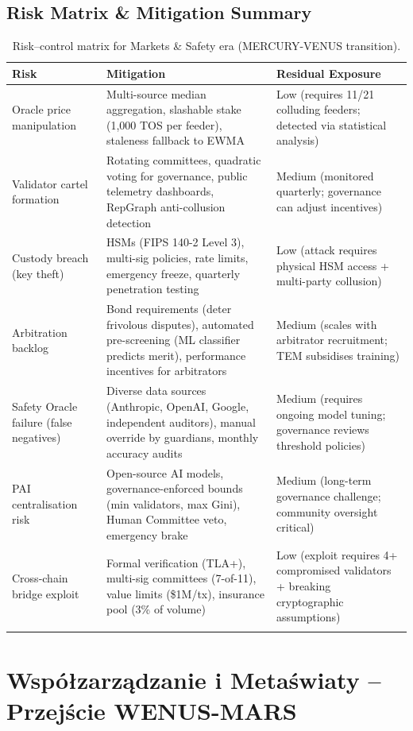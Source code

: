 \documentclass[11pt]{article}
\begin{document}
\subsection{Risk Matrix \& Mitigation Summary}
\begin{longtable}{@{}p{}p{}p{}@{}}
\toprule
\textbf{Risk} & \textbf{Mitigation} & \textbf{Residual Exposure} \\\midrule
Oracle price manipulation & Multi-source median aggregation, slashable stake (1,000 TOS per feeder), staleness fallback to EWMA & Low (requires 11/21 colluding feeders; detected via statistical analysis) \\
Validator cartel formation & Rotating committees, quadratic voting for governance, public telemetry dashboards, RepGraph anti-collusion detection & Medium (monitored quarterly; governance can adjust incentives) \\
Custody breach (key theft) & HSMs (FIPS 140-2 Level 3), multi-sig policies, rate limits, emergency freeze, quarterly penetration testing & Low (attack requires physical HSM access + multi-party collusion) \\
Arbitration backlog & Bond requirements (deter frivolous disputes), automated pre-screening (ML classifier predicts merit), performance incentives for arbitrators & Medium (scales with arbitrator recruitment; TEM subsidises training) \\
Safety Oracle failure (false negatives) & Diverse data sources (Anthropic, OpenAI, Google, independent auditors), manual override by guardians, monthly accuracy audits & Medium (requires ongoing model tuning; governance reviews threshold policies) \\
PAI centralisation risk & Open-source AI models, governance-enforced bounds (min validators, max Gini), Human Committee veto, emergency brake & Medium (long-term governance challenge; community oversight critical) \\
Cross-chain bridge exploit & Formal verification (TLA+), multi-sig committees (7-of-11), value limits (\$1M/tx), insurance pool (3\% of volume) & Low (exploit requires 4+ compromised validators + breaking cryptographic assumptions) \\\bottomrule
\caption{Risk--control matrix for Markets \& Safety era (MERCURY-VENUS transition).}
\label{tab:risk-markets-expanded}
\end{longtable}

\section{Współzarządzanie i Metaświaty -- Przejście WENUS-MARS}
\end{document}
